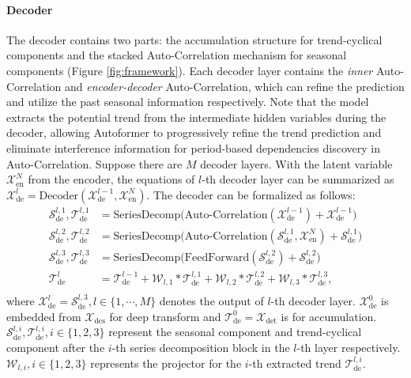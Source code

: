 \paragraph{Decoder}
The decoder contains two parts: the accumulation structure for trend-cyclical components and the stacked Auto-Correlation mechanism for seasonal components (Figure \ref{fig:framework}). Each decoder layer contains the \emph{inner} Auto-Correlation and \emph{encoder-decoder} Auto-Correlation, which can refine the prediction and utilize the past seasonal information respectively. Note that the model extracts the potential trend from the intermediate hidden variables during the decoder, allowing Autoformer to progressively refine the trend prediction and eliminate interference information for period-based dependencies discovery in Auto-Correlation. 
Suppose there are $M$ decoder layers. With the latent variable $\mathcal{X}_{\mathrm{en}}^{N}$ from the encoder, the equations of $l$-th decoder layer can be summarized as $\mathcal{X}_{\mathrm{de}}^{l}=\mathrm{Decoder}(\mathcal{X}_{\mathrm{de}}^{l-1},\mathcal{X}_{\mathrm{en}}^{N})$. The decoder can be formalized as follows:
\begin{equation}\label{equ:overall_decoder}
  \begin{split}
  \mathcal{S}_{\mathrm{de}}^{l,1},\mathcal{T}_{\mathrm{de}}^{l,1} & = \mathrm{SeriesDecomp}\Big(\mathrm{Auto\text{-}Correlation}(\mathcal{X}_{\mathrm{de}}^{l-1})+\mathcal{X}_{\mathrm{de}}^{l-1}\Big) \\
  \mathcal{S}_{\mathrm{de}}^{l,2},\mathcal{T}_{\mathrm{de}}^{l,2} & = \mathrm{SeriesDecomp}\Big(\mathrm{Auto\text{-}Correlation}(\mathcal{S}_{\mathrm{de}}^{l,1}, \mathcal{X}_{\mathrm{en}}^{N})+\mathcal{S}_{\mathrm{de}}^{l,1}\Big) \\
  \mathcal{S}_{\mathrm{de}}^{l,3},\mathcal{T}_{\mathrm{de}}^{l,3} & = \mathrm{SeriesDecomp}\Big(\mathrm{FeedForward}(\mathcal{S}_{\mathrm{de}}^{l,2})+\mathcal{S}_{\mathrm{de}}^{l,2}\Big) \\
  \mathcal{T}_{\mathrm{de}}^{l} & = \mathcal{T}_{\mathrm{de}}^{l-1} + \mathcal{W}_{l,1}\ast\mathcal{T}_{\mathrm{de}}^{l,1}+\mathcal{W}_{l,2}\ast\mathcal{T}_{\mathrm{de}}^{l,2}+\mathcal{W}_{l,3}\ast\mathcal{T}_{\mathrm{de}}^{l,3}, \\
  \end{split}
\end{equation}
where $\mathcal{X}_{\mathrm{de}}^{l}= \mathcal{S}_{\mathrm{de}}^{l,3},l\in\{1,\cdots,M\}$ denotes the output of $l$-th decoder layer. $\mathcal{X}_{\mathrm{de}}^{0}$ is embedded from $\mathcal{X}_{\mathrm{des}}$ for deep transform and $\mathcal{T}_{\mathrm{de}}^{0}=\mathcal{X}_{\mathrm{det}}$ is for accumulation. $\mathcal{S}_{\mathrm{de}}^{l,i},\mathcal{T}_{\mathrm{de}}^{l,i},i\in\{1,2,3\}$ represent the seasonal component and trend-cyclical component after the $i$-th series decomposition block in the $l$-th layer respectively. $\mathcal{W}_{l,i},i\in\{1,2,3\}$ represents the projector for the $i$-th extracted trend $\mathcal{T}_{\mathrm{de}}^{l,i}$.

